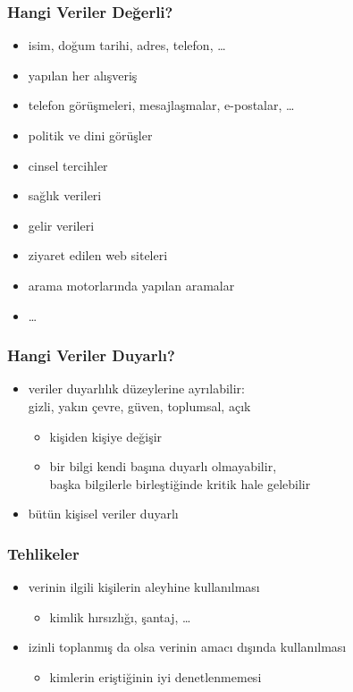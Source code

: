 \documentclass[dvipsnames]{beamer}
\theoremstyle{definition}
\theoremstyle{example}
\theoremstyle{plain}
\begin{document}
\begin{frame}
  \frametitle{Hangi Veriler Değerli?}

  \begin{itemize}
    \item isim, doğum tarihi, adres, telefon, \ldots
    \item yapılan her alışveriş
    \item telefon görüşmeleri, mesajlaşmalar, e-postalar, \ldots
    \item politik ve dini görüşler
    \item cinsel tercihler
    \item sağlık verileri
    \item gelir verileri
    \item ziyaret edilen web siteleri
    \item arama motorlarında yapılan aramalar
    \item \ldots
  \end{itemize}
\end{frame}

\begin{frame}
  \frametitle{Hangi Veriler Duyarlı?}

  \begin{itemize}
    \item veriler duyarlılık düzeylerine ayrılabilir:\\
      gizli, yakın çevre, güven, toplumsal, açık
    \begin{itemize}
      \item kişiden kişiye değişir
      \item bir bilgi kendi başına duyarlı olmayabilir,\\
        başka bilgilerle birleştiğinde kritik hale gelebilir
    \end{itemize}

    \pause
    \bigskip
    \item bütün kişisel veriler duyarlı
  \end{itemize}
\end{frame}

\begin{frame}
  \frametitle{Tehlikeler}

  \begin{itemize}
    \item verinin ilgili kişilerin aleyhine kullanılması
    \begin{itemize}
      \item kimlik hırsızlığı, şantaj, \ldots
    \end{itemize}

    \item izinli toplanmış da olsa verinin amacı dışında kullanılması
    \begin{itemize}
      \item kimlerin eriştiğinin iyi denetlenmemesi
    \end{itemize}
  \end{itemize}
\end{frame}
\end{document}
